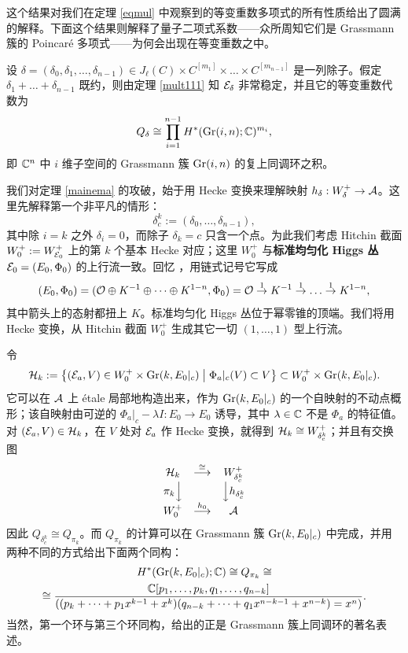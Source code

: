 这个结果对我们在定理 \ref{eqmul} 中观察到的等变重数多项式的所有性质给出了圆满的解释。下面这个结果则解释了量子二项式系数——众所周知它们是 Grassmann 簇的 Poincaré 多项式——为何会出现在等变重数之中。

\begin{theorem}\label{mainema}
设 $\delta=(\delta_0,\delta_1,\dots,\delta_{n-1})\in J_\ell(C)\times C^{[m_1]}\times \dots \times C^{[m_{n-1}]}$ 是一列除子。假定 $\delta_1+\dots+\delta_{n-1}$ 既约，则由定理 \ref{mult111} 知 ${\mathcal E}_\delta$ 非常稳定，并且它的等变重数代数为
\[
Q_{\delta}\cong \prod_{i=1}^{n-1} H^*(\textnormal{Gr}(i,n);\mathbb{C})^{m_i},
\]
即 $\mathbb{C}^n$ 中 $i$ 维子空间的 Grassmann 簇 $\textnormal{Gr}(i,n)$ 的复上同调环之积。
\end{theorem}

我们对定理 \ref{mainema} 的攻破，始于用 Hecke 变换来理解映射 $h_{\delta}:W^+_{\delta}\to {\mathcal{A}}$。这里先解释第一个非平凡的情形：
\[
\delta^k_c:=(\delta_0,\dots,\delta_{n-1}),
\]
其中除 $i=k$ 之外 $\delta_i=0$，而除子 $\delta_k=c$ 只含一个点。为此我们考虑 Hitchin 截面 $W^+_0:=W^+_{{\mathcal E}_0}$ 上的第 $k$ 个基本 Hecke 对应；这里 $W^+_0$ 与\textbf{标准均匀化 Higgs 丛} ${\mathcal E}_0=(E_0,\Phi_0)$ 的上行流一致。回忆 \cite[(3.16)]{hausel-hitchin}，用链式记号它写成
\[
(E_0,\Phi_0)=({\mathcal O}\oplus K^{-1}\oplus \dots\oplus K^{1-n},\Phi_0)= {\mathcal O}\stackrel{1}{\rightarrow} K^{-1} \stackrel{1}{\rightarrow} \dots \stackrel{1}{\rightarrow}  K^{1-n},
\]
其中箭头上的态射都扭上 $K$。标准均匀化 Higgs 丛位于幂零锥的顶端。我们将用 Hecke 变换，从 Hitchin 截面 $W^+_0$ 生成其它一切 $(1,\dots,1)$ 型上行流。

令
\begin{equation}\label{fundamental}
\mathcal{H}_k:=\left\{ ({\mathcal E}_a,V)\in W^+_0\times \textnormal{Gr}(k, E_0|_{c})\;\middle|\; \Phi_a|_{c}(V)\subset V\right\}\subset W^+_0\times \textnormal{Gr}(k, E_0|_{c}).
\end{equation}
它可以在 ${\mathcal{A}}$ 上 étale 局部地构造出来，作为 $\textnormal{Gr}(k,E_0|_{c})$ 的一个自映射的不动点概形；该自映射由可逆的 $\Phi_a|_{c}-\lambda I :E_0\to E_0$ 诱导，其中 $\lambda\in \mathbb{C}$ 不是 $\Phi_a$ 的特征值。对 $({\mathcal E}_a,V)\in \mathcal{H}_k$，在 $V$ 处对 ${\mathcal E}_a$ 作 Hecke 变换，就得到 $\mathcal{H}_k\cong W^+_{\delta^k_c}$；并且有交换图
\[
\begin{array}{ccc}
\mathcal{H}_k&\stackrel{\cong}{\longrightarrow}& W^+_{\delta^k_c}\\
\pi_k{\Big\downarrow} && {\Big\downarrow} h_{{\delta^k_c}} \\
W^+_0 &\stackrel{h_0}{\longrightarrow}& {\mathcal{A}}
\end{array}
\]
因此 $Q_{\delta^k_c}\cong Q_{\pi_k}$。而 $Q_{\pi_k}$ 的计算可以在 Grassmann 簇 $\textnormal{Gr}(k, E_0|_{c})$ 中完成，并用两种不同的方式给出下面两个同构：
\begin{multline}\label{cohgras}
H^*(\textnormal{Gr}(k, E_0|_{c});\mathbb{C})\cong Q_{\pi_k}\cong  \\
\cong \frac{\mathbb{C}[p_1,\dots,p_k,q_1,\dots,q_{n-k}]}{\left((p_k+\dots+p_1x^{k-1}+x^k)(q_{n-k}+\dots+q_1x^{n-k-1}+x^{n-k})=x^n\right)}.
\end{multline}
当然，第一个环与第三个环同构，给出的正是 Grassmann 簇上同调环的著名表述。

